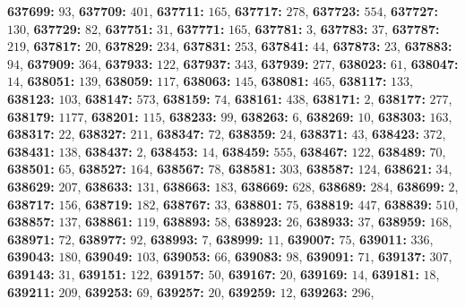 \textsf{\bfseries 637699:} $93$, \textsf{\bfseries 637709:} $401$, \textsf{\bfseries 637711:} $165$, \textsf{\bfseries 637717:} $278$, \textsf{\bfseries 637723:} $554$, \textsf{\bfseries 637727:} $130$, \textsf{\bfseries 637729:} $82$, \textsf{\bfseries 637751:} $31$, \textsf{\bfseries 637771:} $165$, \textsf{\bfseries 637781:} $3$, \textsf{\bfseries 637783:} $37$, \textsf{\bfseries 637787:} $219$, \textsf{\bfseries 637817:} $20$, \textsf{\bfseries 637829:} $234$, \textsf{\bfseries 637831:} $253$, \textsf{\bfseries 637841:} $44$, \textsf{\bfseries 637873:} $23$, \textsf{\bfseries 637883:} $94$, \textsf{\bfseries 637909:} $364$, \textsf{\bfseries 637933:} $122$, \textsf{\bfseries 637937:} $343$, \textsf{\bfseries 637939:} $277$, \textsf{\bfseries 638023:} $61$, \textsf{\bfseries 638047:} $14$, \textsf{\bfseries 638051:} $139$, \textsf{\bfseries 638059:} $117$, \textsf{\bfseries 638063:} $145$, \textsf{\bfseries 638081:} $465$, \textsf{\bfseries 638117:} $133$, \textsf{\bfseries 638123:} $103$, \textsf{\bfseries 638147:} $573$, \textsf{\bfseries 638159:} $74$, \textsf{\bfseries 638161:} $438$, \textsf{\bfseries 638171:} $2$, \textsf{\bfseries 638177:} $277$, \textsf{\bfseries 638179:} $1177$, \textsf{\bfseries 638201:} $115$, \textsf{\bfseries 638233:} $99$, \textsf{\bfseries 638263:} $6$, \textsf{\bfseries 638269:} $10$, \textsf{\bfseries 638303:} $163$, \textsf{\bfseries 638317:} $22$, \textsf{\bfseries 638327:} $211$, \textsf{\bfseries 638347:} $72$, \textsf{\bfseries 638359:} $24$, \textsf{\bfseries 638371:} $43$, \textsf{\bfseries 638423:} $372$, \textsf{\bfseries 638431:} $138$, \textsf{\bfseries 638437:} $2$, \textsf{\bfseries 638453:} $14$, \textsf{\bfseries 638459:} $555$, \textsf{\bfseries 638467:} $122$, \textsf{\bfseries 638489:} $70$, \textsf{\bfseries 638501:} $65$, \textsf{\bfseries 638527:} $164$, \textsf{\bfseries 638567:} $78$, \textsf{\bfseries 638581:} $303$, \textsf{\bfseries 638587:} $124$, \textsf{\bfseries 638621:} $34$, \textsf{\bfseries 638629:} $207$, \textsf{\bfseries 638633:} $131$, \textsf{\bfseries 638663:} $183$, \textsf{\bfseries 638669:} $628$, \textsf{\bfseries 638689:} $284$, \textsf{\bfseries 638699:} $2$, \textsf{\bfseries 638717:} $156$, \textsf{\bfseries 638719:} $182$, \textsf{\bfseries 638767:} $33$, \textsf{\bfseries 638801:} $75$, \textsf{\bfseries 638819:} $447$, \textsf{\bfseries 638839:} $510$, \textsf{\bfseries 638857:} $137$, \textsf{\bfseries 638861:} $119$, \textsf{\bfseries 638893:} $58$, \textsf{\bfseries 638923:} $26$, \textsf{\bfseries 638933:} $37$, \textsf{\bfseries 638959:} $168$, \textsf{\bfseries 638971:} $72$, \textsf{\bfseries 638977:} $92$, \textsf{\bfseries 638993:} $7$, \textsf{\bfseries 638999:} $11$, \textsf{\bfseries 639007:} $75$, \textsf{\bfseries 639011:} $336$, \textsf{\bfseries 639043:} $180$, \textsf{\bfseries 639049:} $103$, \textsf{\bfseries 639053:} $66$, \textsf{\bfseries 639083:} $98$, \textsf{\bfseries 639091:} $71$, \textsf{\bfseries 639137:} $307$, \textsf{\bfseries 639143:} $31$, \textsf{\bfseries 639151:} $122$, \textsf{\bfseries 639157:} $50$, \textsf{\bfseries 639167:} $20$, \textsf{\bfseries 639169:} $14$, \textsf{\bfseries 639181:} $18$, \textsf{\bfseries 639211:} $209$, \textsf{\bfseries 639253:} $69$, \textsf{\bfseries 639257:} $20$, \textsf{\bfseries 639259:} $12$, \textsf{\bfseries 639263:} $296$, 
